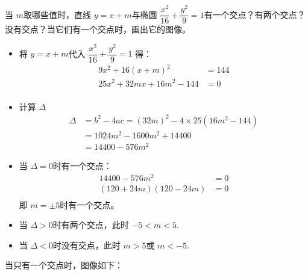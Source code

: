 \documentclass[answers]{exam}
\begin{document}
\begin{questions}
	\question 当 \( m \)取哪些值时，直线 \( y = x + m \)与椭圆 \( \dfrac{x^2}{16} + \dfrac{y^2}{9} = 1
	\)有一个交点？有两个交点？没有交点？当它们有一个交点时，画出它的图像。

	\begin{solution}
		\begin{itemize}
			\item 将 \( y = x + m \)代入 \( \dfrac{x^2}{16} + \dfrac{y^2}{9} = 1  \) 得：
			      \begin{align*}
				      9x^2 + 16(x+m)^2           & = 144 \\
				      25x^2 + 32mx + 16m^2 - 144 & = 0   \\
			      \end{align*}
			\item 计算 \( \Delta \)
			      \begin{align*}
				      \Delta & = b^2 - 4ac = (32m)^2 - 4\times25(16m^2 - 144) \\
				             & = 1024m^2 - 1600m^2 + 14400                    \\
				             & = 14400 - 576m^2
			      \end{align*}
			\item 当 \( \Delta = 0 \)时有一个交点：
			      \begin{align*}
				      14400 - 576m^2         & = 0 \\
				      (120 + 24m)(120 - 24m) & = 0 \\
			      \end{align*}
			      即 \( m = \pm5 \)时有一个交点。
			\item 当 	\(  \Delta > 0 \)时有两个交点，此时 \( -5 < m < 5 \).
			\item 当 \( \Delta < 0 \)时没有交点，此时 \( m > 5 \)或 \( m < -5 \).

		\end{itemize}
		当只有一个交点时，图像如下：
		\begin{center}
		\end{center}
	\end{solution}


\end{questions}
\end{document}

